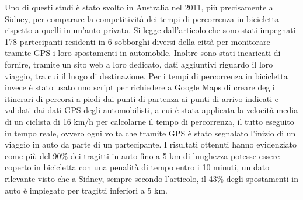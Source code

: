 Uno di questi studi è stato svolto in Australia nel 2011, più precisamente a Sidney, per comparare la competitività dei tempi di percorrenza in bicicletta rispetto a quelli in un'auto privata\cite{ellison2011}. Si legge dall'articolo che sono stati impegnati 178 partecipanti residenti in 6 sobborghi diversi della città per monitorare tramite GPS i loro spostamenti in automobile. Inoltre sono stati incaricati di fornire, tramite un sito web a loro dedicato, dati aggiuntivi riguardo il loro viaggio, tra cui il luogo di destinazione. Per i tempi di percorrenza in bicicletta invece è stato usato uno script per richiedere a Google Maps di creare degli itinerari di percorsi a piedi dai punti di partenza ai punti di arrivo indicati e validati dai dati GPS degli automobilisti, a cui è stata applicata la velocità media di un ciclista di 16 km/h per calcolarne il tempo di percorrenza, il tutto eseguito in tempo reale, ovvero ogni volta che tramite GPS è stato segnalato l'inizio di un viaggio in auto da parte di un partecipante. I risultati ottenuti hanno evidenziato come più del 90\% dei tragitti in auto fino a 5 km di lunghezza potesse essere coperto in bicicletta con una penalità di tempo entro i 10 minuti, un dato rilevante visto che a Sidney, sempre secondo l'articolo, il 43\% degli spostamenti in auto è impiegato per tragitti inferiori a 5 km.

